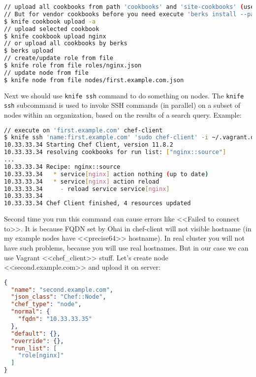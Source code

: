 \begin{lstlisting}[language=Bash,label=lst:my-serer-cloud-role4]
// upload all cookbooks from path 'cookbooks' and 'site-cookbooks' (use --force if cookbook frozen).
// But for vendor cookbooks before you need execute 'berks install --path cookbooks'
$ knife cookbook upload -a
// upload selected cookbook
$ knife cookbook upload nginx
// or upload all cookbooks by berks
$ berks upload
// create/update role from file
$ knife role from file roles/nginx.json
// update node from file
$ knife node from file nodes/first.example.com.json
\end{lstlisting}

Next we should use \lstinline!knife ssh! command to do something on nodes. The \lstinline!knife ssh! subcommand is used to invoke SSH commands (in parallel) on a subset of nodes within an organization, based on the results of a search query. Example:

\begin{lstlisting}[language=Bash,label=lst:my-serer-cloud-role5]
// execute on 'first.example.com' chef-client
$ knife ssh 'name:first.example.com' 'sudo chef-client' -i ~/.vagrant.d/insecure_private_key -x vagrant
10.33.33.34 Starting Chef Client, version 11.8.2
10.33.33.34 resolving cookbooks for run list: ["nginx::source"]
...
10.33.33.34 Recipe: nginx::source
10.33.33.34   * service[nginx] action nothing (up to date)
10.33.33.34   * service[nginx] action reload
10.33.33.34     - reload service service[nginx]
10.33.33.34
10.33.33.34 Chef Client finished, 4 resources updated
\end{lstlisting}

Second time you run this command can cause errors like <<Failed to connect to>>. It is because FQDN set by Ohai in chef-client will not visible hostname (in my example nodes have <<precise64>> hostname). In real cluster you will not have such problems, because you will use real hostnames. But in our case we can use Vagrant <<chef\_client>> stuff. Let's create node <<second.example.com>> and upload it on server:

\begin{lstlisting}[language=JSON,label=lst:my-serer-cloud-role6,title=my-server-cloud/nodes/second.example.com.json]
{
  "name": "second.example.com",
  "json_class": "Chef::Node",
  "chef_type": "node",
  "normal": {
    "fqdn": "10.33.33.35"
  },
  "default": {},
  "override": {},
  "run_list": [
    "role[nginx]"
  ]
}
\end{lstlisting}

